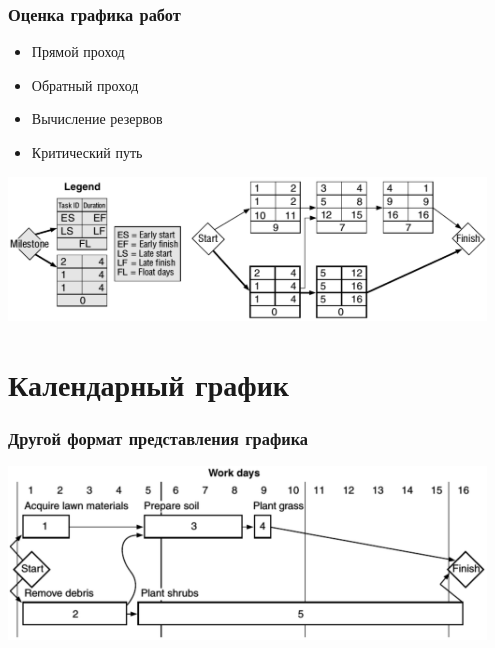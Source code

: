 \documentclass{../../slides-style}
\begin{document}
    \begin{frame}
        \frametitle{Оценка графика работ}
        \begin{itemize}
            \item Прямой проход
            \item Обратный проход
            \item Вычисление резервов
            \item Критический путь
        \end{itemize}
        \begin{center}
            \includegraphics[width=0.95\textwidth]{graphEstimate.png}
        \end{center}
    \end{frame}

    \section{Календарный график}

    \begin{frame}
        \frametitle{Другой формат представления графика}
        \begin{center}
            \includegraphics[width=0.95\textwidth]{otherGraphFormat.png}
        \end{center}
    \end{frame}
\end{document}
